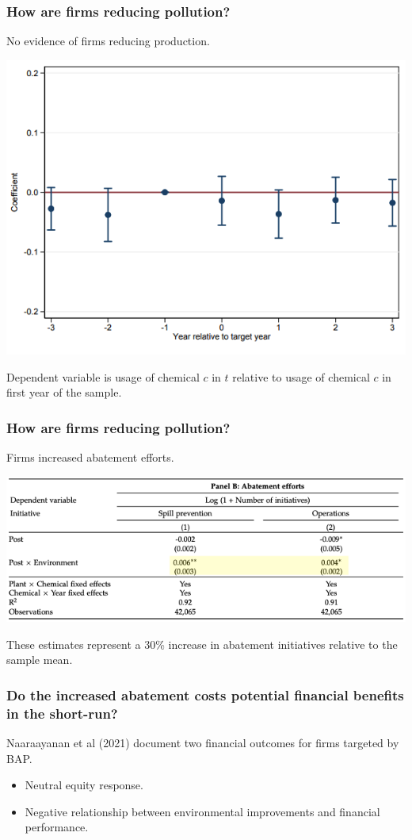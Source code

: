 \documentclass{beamer}
\begin{document}
\begin{frame}
\frametitle{How are firms reducing pollution?}
No evidence of firms reducing production.
\bigskip

\includegraphics[scale=0.4]{production}

\bigskip

Dependent variable is usage of chemical $c$ in $t$ relative to usage of chemical $c$ in first year of the sample.
\end{frame}


\begin{frame}
\frametitle{How are firms reducing pollution? }
Firms increased abatement efforts.

\bigskip

\includegraphics[scale=0.45]{abatement_table}

\bigskip

These estimates represent a 30\% increase in abatement initiatives relative to the sample mean.

\end{frame}

\begin{frame}
\frametitle{Do the increased abatement costs potential financial benefits in the short-run?}

Naaraayanan et al (2021) document two financial outcomes for firms targeted by BAP.

\begin{itemize}[<+->]
\item Neutral equity response.
\item Negative relationship between environmental improvements and financial performance.
\end{itemize}
\end{frame}
\end{document}

